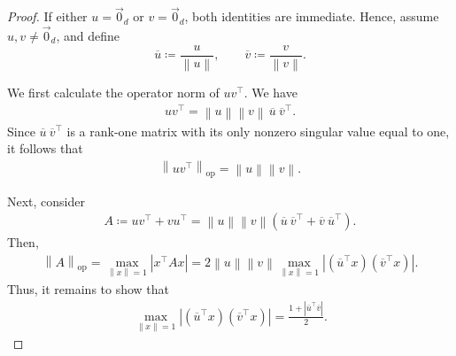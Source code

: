 \documentclass[10pt,a4paper]{amsart}
\newcommand{\Norm}[1]{\left\| #1 \right\|}
\newcommand{\abs}[1]{\left| #1 \right|}
\providecommand{\norm}[1]{\Norm{#1}}
\begin{document}
\begin{proof}
    If either $u=\vec{0}_d$ or $v=\vec{0}_d$, both identities are immediate. Hence, assume
    $u,v\neq \vec{0}_d$, and define
    \[
        \overline{u}\coloneq \frac{u}{\norm{u}},
        \qquad
        \overline{v}\coloneq \frac{v}{\norm{v}}.
    \]

    We first calculate the operator norm of $uv^{\top}$. We have
    \begin{align}
        uv^{\top}
        =
        \norm{u}\norm{v}\,
        \overline{u}\ \overline{v}^{\top}.
    \end{align}
    Since $\overline{u}\ \overline{v}^{\top}$ is a rank-one matrix with its only
    nonzero singular value equal to one, it follows that
    \begin{align}
        \norm{uv^{\top}}_{\mathrm{op}}
        =
        \norm{u}\norm{v}.
    \end{align}

    Next, consider
    \begin{align}
        A
        \coloneq
        uv^{\top}+vu^{\top}
        =
        \norm{u}\norm{v}
        \left(
        \overline{u}\ \overline{v}^{\top}
        +
        \overline{v}\ \overline{u}^{\top}
        \right).
    \end{align}
    Then, 
    \begin{align}
        \norm{A}_{\mathrm{op}} = \max_{\norm{x}=1}\abs{x^{\top}Ax} = 2\norm{u}\norm{v}\max_{\norm{x}=1}\abs{(\overline{u}^{\top}x)(\overline{v}^{\top}x)}.
    \end{align}
    Thus, it remains to show that
    \begin{align}
        \max_{\norm{x}=1}
        \abs{
        (\overline{u}^{\top}x)(\overline{v}^{\top}x)
        }
        =
        \frac{1+\abs{\overline{u}^{\top}\overline{v}}}{2}.
    \end{align}


\end{proof}
\end{document}
